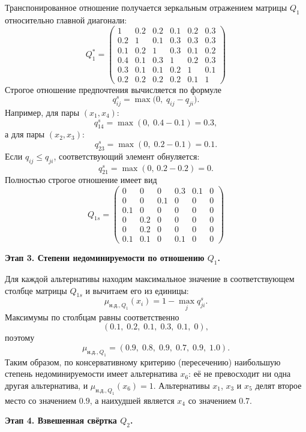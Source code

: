 Транспонированное отношение получается зеркальным отражением матрицы $Q_1$ относительно главной диагонали:
\[
Q_1^{*} = \begin{pmatrix}
1 & 0.2 & 0.2 & 0.1 & 0.2 & 0.3 \\
0.2 & 1 & 0.1 & 0.3 & 0.3 & 0.3 \\
0.1 & 0.2 & 1 & 0.3 & 0.1 & 0.2 \\
0.4 & 0.1 & 0.3 & 1 & 0.2 & 0.3 \\
0.3 & 0.1 & 0.1 & 0.2 & 1 & 0.1 \\
0.2 & 0.2 & 0.2 & 0.2 & 0.1 & 1
\end{pmatrix}
\]
Строгое отношение предпочтения вычисляется по формуле
\[
q^{s}_{ij} = \max\bigl(0,\; q_{ij} - q_{ji}\bigr).
\]
Например, для пары $(x_1, x_4)$:
\[
q^{s}_{14} = \max(0,\; 0.4 - 0.1) = 0.3,
\]
а для пары $(x_2, x_3)$:
\[
q^{s}_{23} = \max(0,\; 0.2 - 0.1) = 0.1.
\]
Если $q_{ij} \le q_{ji}$, соответствующий элемент обнуляется:
\[
q^{s}_{21} = \max(0,\,0.2-0.2) = 0.
\]
Полностью строгое отношение имеет вид
\[
Q_{1s} = \begin{pmatrix}
0 & 0 & 0 & 0.3 & 0.1 & 0 \\
0 & 0 & 0.1 & 0 & 0 & 0 \\
0.1 & 0 & 0 & 0 & 0 & 0 \\
0 & 0.2 & 0 & 0 & 0 & 0 \\
0 & 0.2 & 0 & 0 & 0 & 0 \\
0.1 & 0.1 & 0 & 0.1 & 0 & 0
\end{pmatrix}
\]


\textbf{Этап 3. Степени недоминируемости по отношению $Q_1$.}

Для каждой альтернативы находим максимальное значение в соответствующем столбце матрицы $Q_{1s}$ и вычитаем его из единицы:
\[
\mu_{\text{н.д.},Q_1}(x_i) = 1 - \max_{j} q^{s}_{ji}.
\]
Максимумы по столбцам равны соответственно
\[
(0.1,\; 0.2,\; 0.1,\; 0.3,\; 0.1,\; 0),
\]
поэтому
\[
\mu_{\text{н.д.},Q_1} = (0.9,\; 0.8,\; 0.9,\; 0.7,\; 0.9,\; 1.0).
\]
Таким образом, по консервативному критерию (пересечению) наибольшую степень недоминируемости имеет альтернатива $x_6$: её не превосходит ни одна другая альтернатива, и $\mu_{\text{н.д.},Q_1}(x_6) = 1$. Альтернативы $x_1$, $x_3$ и $x_5$ делят второе место со значением $0.9$, а наихудшей является $x_4$ со значением $0.7$.


\textbf{Этап 4. Взвешенная свёртка $Q_2$.}

